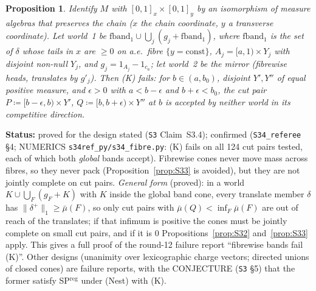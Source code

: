 \documentclass[11pt]{article}
\newtheorem{proposition}[theorem]{Proposition}
\theoremstyle{definition}
\theoremstyle{remark}
\newcommand{\src}[1]{\texttt{#1}}
\newcommand{\status}[1]{\par\smallskip\noindent\textbf{Status:} #1\par\smallskip}
\begin{document}
\begin{proposition}\label{prop:S34}
Identify $M$ with $[0,1]_x\times[0,1]_y$ by an isomorphism of measure algebras that preserves the chain ($x$ the chain coordinate, $y$ a transverse coordinate). Let world~1 be $\mathrm{fband}_1\cup\bigcup_j(g_j+\mathrm{fband}_1)$, where $\mathrm{fband}_1$ is the set of $\delta$ whose tails in $x$ are $\ge0$ on a.e.\ fibre $\{y=\text{const}\}$, $A_j=[a,1)\times Y_j$ with disjoint non-null $Y_j$, and $g_j=1_{A_j}-1_{c_a}$; let world~2 be the mirror (fibrewise heads, translates by $g'_j$). Then (K) fails: for $b\in(a,b_0)$, disjoint $Y',Y''$ of equal positive measure, and $\epsilon>0$ with $a<b-\epsilon$ and $b+\epsilon<b_0$, the cut pair $P\coloneqq[b-\epsilon,b)\times Y'$, $Q\coloneqq[b,b+\epsilon)\times Y''$ at $b$ is accepted by neither world in its competitive direction.
\end{proposition}
\status{proved for the design stated (\src{S3} Claim~S3.4); confirmed (\src{S34\_referee} \S4; NUMERICS \src{s34ref\_py/s34\_fibre.py}: (K) fails on all 124 cut pairs tested, each of which both \emph{global} bands accept). Fibrewise cones never move mass across fibres, so they never pack (Proposition~\ref{prop:S33} is avoided), but they are not jointly complete on cut pairs. \emph{General form} (proved): in a world $K\cup\bigcup_F(g_F+K)$ with $K$ inside the global band cone, every translate member $\delta$ has $\|\delta^+\|_1\ge\bar\mu(F)$, so only cut pairs with $\bar\mu(Q)<\inf_F\bar\mu(F)$ are out of reach of the translates; if that infimum is positive the cones must be jointly complete on small cut pairs, and if it is $0$ Propositions~\ref{prop:S32} and~\ref{prop:S33} apply. This gives a full proof of the round-12 failure report ``fibrewise bands fail (K)''. Other designs (unanimity over lexicographic charge vectors; directed unions of closed cones) are failure reports, with the CONJECTURE (\src{S3} \S5) that the former satisfy SP$^{\mathrm{reg}}$ under (Nest) with (K).}
\end{document}
